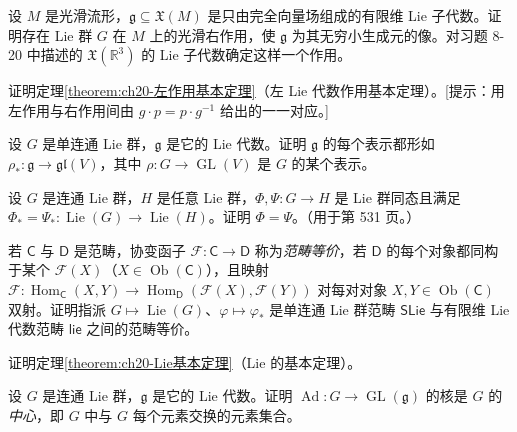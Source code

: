\documentclass[../../main.tex]{subfiles}
\begin{document}
\begin{exercise}\label{exercise:ch20-14}
设 $M$ 是光滑流形，$\mathfrak g\subseteq\mathfrak X(M)$ 是只由完全向量场组成的有限维 Lie 子代数。证明存在 Lie 群 $G$ 在 $M$ 上的光滑右作用，使 $\mathfrak g$ 为其无穷小生成元的像。对习题 8-20 中描述的 $\mathfrak X(\mathbb{R}^3)$ 的 Lie 子代数确定这样一个作用。
\end{exercise}

\begin{exercise}\label{exercise:ch20-15}
证明定理\cref{theorem:ch20-左作用基本定理}（左 Lie 代数作用基本定理）。[提示：用左作用与右作用间由 $g\cdot p=p\cdot g^{-1}$ 给出的一一对应。]
\end{exercise}

\begin{exercise}\label{exercise:ch20-16}
设 $G$ 是单连通 Lie 群，$\mathfrak g$ 是它的 Lie 代数。证明 $\mathfrak g$ 的每个表示都形如 $\rho_*\colon\mathfrak g\to\mathfrak{gl}(V)$，其中 $\rho\colon G\to\operatorname{GL}(V)$ 是 $G$ 的某个表示。
\end{exercise}

\begin{exercise}\label{exercise:ch20-17}
设 $G$ 是连通 Lie 群，$H$ 是任意 Lie 群，$\Phi,\Psi\colon G\to H$ 是 Lie 群同态且满足 $\Phi_*=\Psi_*\colon\operatorname{Lie}(G)\to\operatorname{Lie}(H)$。证明 $\Phi=\Psi$。（用于第 531 页。）
\end{exercise}

\begin{exercise}\label{exercise:ch20-18}
若 $\mathsf C$ 与 $\mathsf D$ 是范畴，协变函子 $\mathscr F\colon\mathsf C\to\mathsf D$ 称为\emph{范畴等价}，若 $\mathsf D$ 的每个对象都同构于某个 $\mathscr F(X)$（$X\in\operatorname{Ob}(\mathsf C)$），且映射 $\mathscr F\colon\operatorname{Hom}_{\mathsf C}(X,Y)\to\operatorname{Hom}_{\mathsf D}(\mathscr F(X),\mathscr F(Y))$ 对每对对象 $X,Y\in\operatorname{Ob}(\mathsf C)$ 双射。证明指派 $G\mapsto\operatorname{Lie}(G)$、$\varphi\mapsto\varphi_*$ 是单连通 Lie 群范畴 $\mathsf{SLie}$ 与有限维 Lie 代数范畴 $\mathsf{lie}$ 之间的范畴等价。
\end{exercise}

\begin{exercise}\label{exercise:ch20-19}
证明定理\cref{theorem:ch20-Lie基本定理}（Lie 的基本定理）。
\end{exercise}

\begin{exercise}\label{exercise:ch20-20}
设 $G$ 是连通 Lie 群，$\mathfrak g$ 是它的 Lie 代数。证明 $\operatorname{Ad}\colon G\to\operatorname{GL}(\mathfrak g)$ 的核是 $G$ 的\emph{中心}，即 $G$ 中与 $G$ 每个元素交换的元素集合。
\end{exercise}
\end{document}
